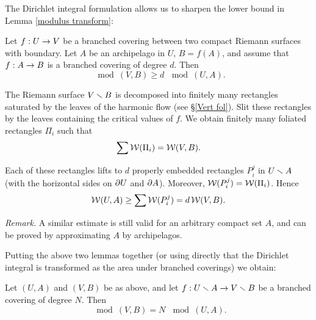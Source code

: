 The Dirichlet integral formulation allows us to sharpen the lower bound in Lemma \ref{modulus transform}:

\begin{lem}\label{modulus transform-2}
 Let $f: U\rightarrow V$ be a branched covering between two compact Riemann surfaces with boundary.
Let $A$ be an archipelago in $U$,  $B=f(A)$, and 
assume that  $f:  A\rightarrow B$ is a branched covering of degree $d$. Then   
$$
      \mod(V, B) \geq d\, \mod (U,  A).
$$   
\end{lem}

\begin{pf}
The Riemann surface  $V \smallsetminus B$ is decomposed into finitely many rectangles saturated by the leaves of the harmonic flow
(see \S \ref{Vert fol}). Slit these rectangles by the leaves containing the critical values of $f$.
We obtain finitely many foliated rectangles $\Pi_i$ such that
$$
         \sum {\cal W}(\Pi_i) = {\cal W}(V, B).
$$

Each of these rectangles lifts to $d$ properly embedded rectangles $P_i^j$ in $U\smallsetminus A$
(with the horizontal sides on $\partial U$ and $\partial A$). Moreover, ${\cal W}(P_i^j)={\cal W}(\Pi_i)$.
Hence
$$
        {\cal W}(U,A) \geq \sum {\cal W}(P_i^j) = d\,  {\cal W}(V,B). 
$$
\end{pf}

{\it Remark.} A similar estimate is still valid for an arbitrary compact set $A$,
and can be proved by approximating $A$ by  archipelagos.

\ssk

Putting the above two lemmas together
(or using directly that the Dirichlet integral is transformed as the area     
under branched coverings) we obtain:  


\begin{lem}\label{modulus transform-1}
Let $(U,A)$ and $(V,B)$ be as above,
and let  $f: U\smallsetminus A\rightarrow V\smallsetminus B$ be a branched covering of degree $N$. Then   
$$
      \mod(V, B)= N\, \mod (U,  A).
$$   
\end{lem}

